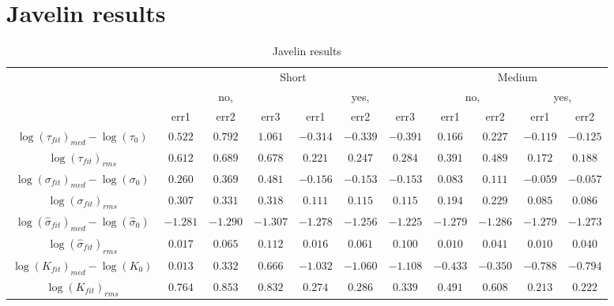 \documentclass[11pt]{article}
\begin{document}
\section{Javelin results}\begin{table}[htp]
	\begin{center}
	\caption{Javelin results}
		\begin{tabular}{ccccccccccc}
		\toprule
			{ } & \multicolumn{6}{c}{Short} & \multicolumn{4}{c}{Medium}\\\cmidrule(r){2-7}\cmidrule(r){8-11}
			{ } & \multicolumn{3}{c}{no,} & \multicolumn{3}{c}{yes,} & \multicolumn{2}{c}{no,} & \multicolumn{2}{c}{yes,}\\\cmidrule(r){2-4}\cmidrule(r){5-7}\cmidrule(r){8-9}\cmidrule(r){10-11}
			{ } & {err1} & {err2} & {err3} & {err1} & {err2} & {err3} & {err1} & {err2} & {err1} & {err2}\\
			\midrule
			$\log(\tau_{fit})_{med}- \log(\tau_{0})$ & $0.522$ & $0.792$ & $1.061$ & $-0.314$ & $-0.339$ & $-0.391$ & $0.166$ & $0.227$ & $-0.119$ & $-0.125$\\
			$\log(\tau_{fit})_{rms}$ & $0.612$ & $0.689$ & $0.678$ & $0.221$ & $0.247$ & $0.284$ & $0.391$ & $0.489$ & $0.172$ & $0.188$\\
			$\log(\sigma_{fit})_{med} -\log(\sigma_{0})$ & $0.260$ & $0.369$ & $0.481$ & $-0.156$ & $-0.153$ & $-0.153$ & $0.083$ & $0.111$ & $-0.059$ & $-0.057$\\
			$\log(\sigma_{fit})_{rms}$ & $0.307$ & $0.331$ & $0.318$ & $0.111$ & $0.115$ & $0.115$ & $0.194$ & $0.229$ & $0.085$ & $0.086$\\
			$\log(\hat{\sigma}_{fit})_{med} -\log(\hat{\sigma}_{0})$ & $-1.281$ & $-1.290$ & $-1.307$ & $-1.278$ & $-1.256$ & $-1.225$ & $-1.279$ & $-1.286$ & $-1.279$ & $-1.273$\\
			$\log(\hat{\sigma}_{fit})_{rms}$ & $0.017$ & $0.065$ & $0.112$ & $0.016$ & $0.061$ & $0.100$ & $0.010$ & $0.041$ & $0.010$ & $0.040$\\
			$\log(K_{fit})_{med} -\log(K_{0})$ & $0.013$ & $0.332$ & $0.666$ & $-1.032$ & $-1.060$ & $-1.108$ & $-0.433$ & $-0.350$ & $-0.788$ & $-0.794$\\
			$\log(K_{fit})_{rms}$ & $0.764$ & $0.853$ & $0.832$ & $0.274$ & $0.286$ & $0.339$ & $0.491$ & $0.608$ & $0.213$ & $0.222$\\
		\bottomrule
		\end{tabular}
	\end{center}
\end{table}
\end{document}
